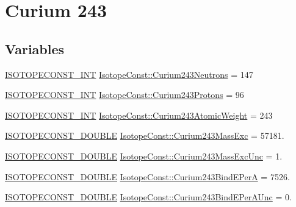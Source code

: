 \hypertarget{group___isotope_const-_curium-_cm243}{}\section{Curium 243}
\label{group___isotope_const-_curium-_cm243}
\subsection*{Variables}
\begin{DoxyCompactItemize}
\item 
\mbox{\hyperlink{group___isotope_const-_macros_ga5f18360b3e99483a35c32d789e62621c}{I\+S\+O\+T\+O\+P\+E\+C\+O\+N\+S\+T\+\_\+\+I\+NT}} \mbox{\hyperlink{group___isotope_const-_curium-_cm243_ga302b50815792888554a59b0a2918ff74}{Isotope\+Const\+::\+Curium243\+Neutrons}} = 147
\item 
\mbox{\hyperlink{group___isotope_const-_macros_ga5f18360b3e99483a35c32d789e62621c}{I\+S\+O\+T\+O\+P\+E\+C\+O\+N\+S\+T\+\_\+\+I\+NT}} \mbox{\hyperlink{group___isotope_const-_curium-_cm243_gaf56ee2bbc276e8b144049477aa9539a4}{Isotope\+Const\+::\+Curium243\+Protons}} = 96
\item 
\mbox{\hyperlink{group___isotope_const-_macros_ga5f18360b3e99483a35c32d789e62621c}{I\+S\+O\+T\+O\+P\+E\+C\+O\+N\+S\+T\+\_\+\+I\+NT}} \mbox{\hyperlink{group___isotope_const-_curium-_cm243_ga702234042b3885ca9f20b2aae86f0035}{Isotope\+Const\+::\+Curium243\+Atomic\+Weight}} = 243
\item 
\mbox{\hyperlink{group___isotope_const-_macros_ga8f45a7272ce02c0b4c65c44636ed719a}{I\+S\+O\+T\+O\+P\+E\+C\+O\+N\+S\+T\+\_\+\+D\+O\+U\+B\+LE}} \mbox{\hyperlink{group___isotope_const-_curium-_cm243_gaf6d4bc18737b0379fe7e24a57878f64b}{Isotope\+Const\+::\+Curium243\+Mass\+Exc}} = 57181.
\item 
\mbox{\hyperlink{group___isotope_const-_macros_ga8f45a7272ce02c0b4c65c44636ed719a}{I\+S\+O\+T\+O\+P\+E\+C\+O\+N\+S\+T\+\_\+\+D\+O\+U\+B\+LE}} \mbox{\hyperlink{group___isotope_const-_curium-_cm243_ga259c2192871f6e1c0735fd4b334b984d}{Isotope\+Const\+::\+Curium243\+Mass\+Exc\+Unc}} = 1.
\item 
\mbox{\hyperlink{group___isotope_const-_macros_ga8f45a7272ce02c0b4c65c44636ed719a}{I\+S\+O\+T\+O\+P\+E\+C\+O\+N\+S\+T\+\_\+\+D\+O\+U\+B\+LE}} \mbox{\hyperlink{group___isotope_const-_curium-_cm243_ga31fb79de53e2fd961e7d07e93bfdfad4}{Isotope\+Const\+::\+Curium243\+Bind\+E\+PerA}} = 7526.
\item 
\mbox{\hyperlink{group___isotope_const-_macros_ga8f45a7272ce02c0b4c65c44636ed719a}{I\+S\+O\+T\+O\+P\+E\+C\+O\+N\+S\+T\+\_\+\+D\+O\+U\+B\+LE}} \mbox{\hyperlink{group___isotope_const-_curium-_cm243_gaf74b5ec4dd800fb71b7ab2b3eaa1b8a4}{Isotope\+Const\+::\+Curium243\+Bind\+E\+Per\+A\+Unc}} = 0.

\end{DoxyCompactItemize}
